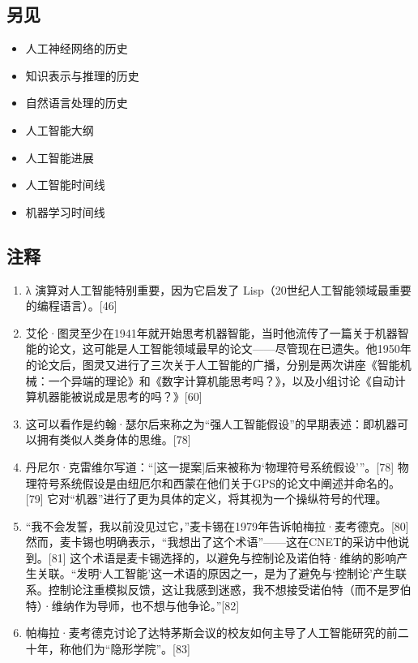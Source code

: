 \subsection{另见}  
\begin{itemize}
\item 人工神经网络的历史  
\item 知识表示与推理的历史  
\item 自然语言处理的历史  
\item 人工智能大纲  
\item 人工智能进展  
\item 人工智能时间线  
\item 机器学习时间线
\end{itemize}
\subsection{注释} 
\begin{enumerate}
\item λ 演算对人工智能特别重要，因为它启发了 Lisp（20世纪人工智能领域最重要的编程语言）。[46]  
\item 艾伦·图灵至少在1941年就开始思考机器智能，当时他流传了一篇关于机器智能的论文，这可能是人工智能领域最早的论文——尽管现在已遗失。他1950年的论文后，图灵又进行了三次关于人工智能的广播，分别是两次讲座《智能机械：一个异端的理论》和《数字计算机能思考吗？》，以及小组讨论《自动计算机器能被说成是思考的吗？》[60]  
\item 这可以看作是约翰·瑟尔后来称之为“强人工智能假设”的早期表述：即机器可以拥有类似人类身体的思维。[78]  
\item 丹尼尔·克雷维尔写道：“[这一提案]后来被称为‘物理符号系统假设’”。[78] 物理符号系统假设是由纽厄尔和西蒙在他们关于GPS的论文中阐述并命名的。[79] 它对“机器”进行了更为具体的定义，将其视为一个操纵符号的代理。  
\item “我不会发誓，我以前没见过它，”麦卡锡在1979年告诉帕梅拉·麦考德克。[80] 然而，麦卡锡也明确表示，“我想出了这个术语”——这在CNET的采访中他说到。[81] 这个术语是麦卡锡选择的，以避免与控制论及诺伯特·维纳的影响产生关联。“发明‘人工智能’这一术语的原因之一，是为了避免与‘控制论’产生联系。控制论注重模拟反馈，这让我感到迷惑，我不想接受诺伯特（而不是罗伯特）·维纳作为导师，也不想与他争论。”[82]  
\item 帕梅拉·麦考德克讨论了达特茅斯会议的校友如何主导了人工智能研究的前二十年，称他们为“隐形学院”。[83]
\end{enumerate}